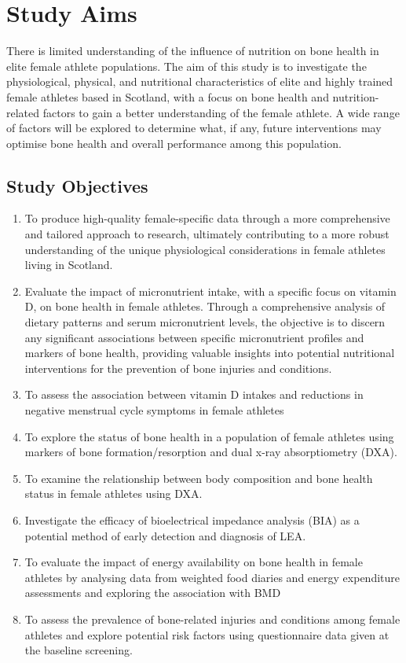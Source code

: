 \documentclass[
]{article}
\begin{document}
\section{Study Aims}\label{study-aims}

There is limited understanding of the influence of nutrition on bone health in elite female athlete populations. The aim of this study is to investigate the physiological, physical, and nutritional characteristics of elite and highly trained female athletes based in Scotland, with a focus on bone health and nutrition-related factors to gain a better understanding of the female athlete. A wide range of factors will be explored to determine what, if any, future interventions may optimise bone health and overall performance among this population.

\subsection{Study Objectives}\label{study-objectives}

\begin{enumerate}
\def\labelenumi{\arabic{enumi}.}
\item
  To produce high-quality female-specific data through a more comprehensive and tailored approach to research, ultimately contributing to a more robust understanding of the unique physiological considerations in female athletes living in Scotland.
\item
  Evaluate the impact of micronutrient intake, with a specific focus on vitamin D, on bone health in female athletes. Through a comprehensive analysis of dietary patterns and serum micronutrient levels, the objective is to discern any significant associations between specific micronutrient profiles and markers of bone health, providing valuable insights into potential nutritional interventions for the prevention of bone injuries and conditions.
\item
  To assess the association between vitamin D intakes and reductions in negative menstrual cycle symptoms in female athletes
\item
  To explore the status of bone health in a population of female athletes using markers of bone formation/resorption and dual x-ray absorptiometry (DXA).
\item
  To examine the relationship between body composition and bone health status in female athletes using DXA.
\item
  Investigate the efficacy of bioelectrical impedance analysis (BIA) as a potential method of early detection and diagnosis of LEA.
\item
  To evaluate the impact of energy availability on bone health in female athletes by analysing data from weighted food diaries and energy expenditure assessments and exploring the association with BMD
\item
  To assess the prevalence of bone-related injuries and conditions among female athletes and explore potential risk factors using questionnaire data given at the baseline screening.
\end{enumerate}
\end{document}
